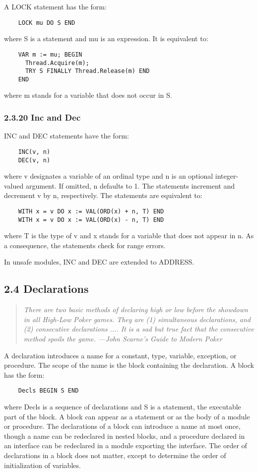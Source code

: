 \documentclass[10pt]{article}
\begin{document}
A LOCK statement has the form:
\begin{verbatim}
    LOCK mu DO S END
\end{verbatim}
where S is a statement and mu is an expression. It is equivalent to:
\begin{verbatim}
    VAR m := mu; BEGIN
      Thread.Acquire(m);
      TRY S FINALLY Thread.Release(m) END
    END
\end{verbatim}
where m stands for a variable that does not occur in S.

\subsubsection*{2.3.20 Inc and Dec}

INC and DEC statements have the form:
\begin{verbatim}
    INC(v, n)
    DEC(v, n)
\end{verbatim}
where v designates a variable of an ordinal type and n is an optional
integer-valued argument. If omitted, n defaults to 1. The statements increment
and decrement v by n, respectively. The statements are equivalent to:
\begin{verbatim}
    WITH x = v DO x := VAL(ORD(x) + n, T) END
    WITH x = v DO x := VAL(ORD(x) - n, T) END
\end{verbatim}
where T is the type of v and x stands for a variable that does not appear in
n. As a consequence, the statements check for range errors.

In unsafe modules, INC and DEC are extended to ADDRESS.

\subsection*{2.4 Declarations}

\begin{quote}
  \emph{ There are two basic methods of declaring high or low before the showdown in all High-Low Poker games. They are (1) simultaneous declarations, and (2) consecutive declarations .... It is a sad but true fact that the consecutive method spoils the game. ---John Scarne's Guide to Modern Poker }
\end{quote}

A declaration introduces a name for a constant, type, variable, exception, or procedure. The scope of the name is the block containing the declaration. A block has the form:
\begin{verbatim}
    Decls BEGIN S END
\end{verbatim}
where Decls is a sequence of declarations and S is a statement, the executable
part of the block. A block can appear as a statement or as the body of a
module or procedure. The declarations of a block can introduce a name at most
once, though a name can be redeclared in nested blocks, and a procedure
declared in an interface can be redeclared in a module exporting the
interface. The order of declarations in a block does not matter, except to
determine the order of initialization of variables.
\end{document}
